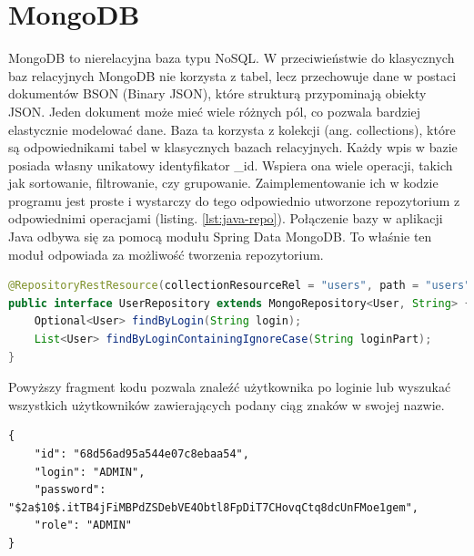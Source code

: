 \section{MongoDB}
MongoDB to nierelacyjna baza typu NoSQL. W przeciwieństwie do klasycznych baz relacyjnych MongoDB nie korzysta z tabel, lecz przechowuje dane w postaci dokumentów BSON (Binary JSON), które strukturą przypominają obiekty JSON.
Jeden dokument może mieć wiele różnych pól, co pozwala bardziej elastycznie modelować dane. Baza ta korzysta z kolekcji (ang. collections), które są odpowiednikami tabel w klasycznych bazach relacyjnych. Każdy wpis w bazie posiada własny unikatowy identyfikator \_id. Wspiera ona wiele operacji, takich jak sortowanie, filtrowanie, czy grupowanie. Zaimplementowanie ich w kodzie programu jest proste i wystarczy do tego odpowiednio utworzone repozytorium z odpowiednimi operacjami (listing. \ref{lst:java-repo}). Połączenie bazy w aplikacji Java odbywa się za pomocą modułu Spring Data MongoDB. To właśnie ten moduł odpowiada za możliwość tworzenia repozytorium.
\begin{lstlisting}[language={Java}, caption={Przykładowe repozytorium w Javie}, label={lst:java-repo}]
@RepositoryRestResource(collectionResourceRel = "users", path = "users")
public interface UserRepository extends MongoRepository<User, String> {
	Optional<User> findByLogin(String login);
	List<User> findByLoginContainingIgnoreCase(String loginPart);	
}	
\end{lstlisting}
Powyższy fragment kodu pozwala znaleźć użytkownika po loginie lub wyszukać wszystkich użytkowników zawierających podany ciąg znaków w swojej nazwie.
\begin{lstlisting}[caption={Przykladowy dokument z kolekcji}, label={lst:MongoDB-doc}]
{
	"id": "68d56ad95a544e07c8ebaa54",
	"login": "ADMIN",
	"password": "$2a$10$.itTB4jFiMBPdZSDebVE4Obtl8FpDiT7CHovqCtq8dcUnFMoe1gem",
	"role": "ADMIN"
}
\end{lstlisting}
